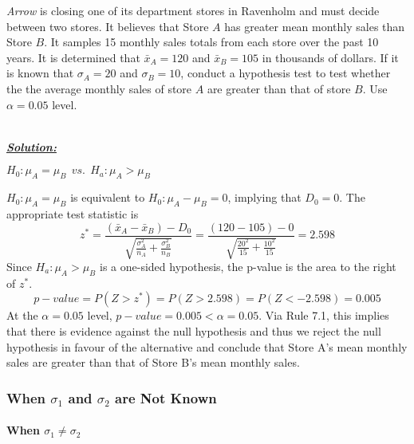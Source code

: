 \begin{example}
\textit{Arrow} is closing one of its department stores in Ravenholm and must decide between two stores. It believes that Store $A$ has greater mean monthly sales than Store $B$. It samples 15 monthly sales totals from each store over the past 10 years. It is determined that $\bar{x}_A = 120$ and $\bar{x}_B=105$ in thousands of dollars. If it is known that $\sigma_A = 20$ and $\sigma_B=10$, 
conduct a hypothesis test to test whether the the average monthly sales of store $A$ are greater than
that of store $B$.
Use $\alpha=0.05$ level. 

\hfill\\
{\emph{\textbf{\underline{Solution:}}}}


\begin{center}
$H_0 : \mu_A = \mu_B ~~vs.~~ H_a : \mu_A > \mu_B$
\end{center}

$H_0: \mu_A = \mu_B$ is equivalent to $H_0: \mu_A - \mu_B = 0$, implying that $D_0 = 0$. The appropriate test statistic is 
\[ z^{*} = \frac{(\bar{x}_A - \bar{x}_B) - D_0}{\sqrt{\displaystyle\frac{\sigma_A^{2}}{n_A} + \frac{\sigma_{B}^{2}}{n_B}}} = \frac{(120-105)-0}{\sqrt{\displaystyle\frac{20^{2}}{15} + \frac{10^{2}}{15}}} = 2.598\]
Since $H_a: \mu_A > \mu_B$ is a one-sided hypothesis, the p-value is the area to the right of $z^{*}$. 
\[ p-value = P(Z>z^{*}) = P(Z> 2.598) = P(Z < -2.598) = 0.005\]
At the $\alpha=0.05$ level, $p-value = 0.005 < \alpha = 0.05$. Via Rule 7.1, this implies that there is evidence against the null hypothesis and thus we reject the null hypothesis in favour of the alternative and conclude that Store A's mean monthly sales are greater than that of Store B's mean monthly sales. 
\end{example}









\subsubsection{When $\sigma_{1}$ and $\sigma_{2}$ are Not Known}

\paragraph{When $\sigma_{1} \neq \sigma_{2}$}~\hfill


